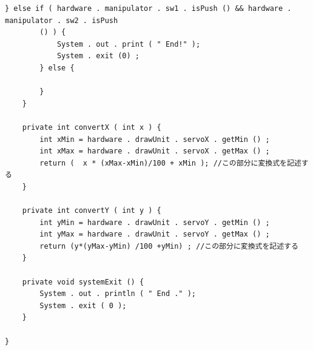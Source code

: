 \documentclass{jarticle}
\begin{document}
\begin{lstlisting}[caption=FigureCheckTool]
        } else if ( hardware . manipulator . sw1 . isPush () && hardware . manipulator . sw2 . isPush
        () ) {
            System . out . print ( " End!" );
            System . exit (0) ;
        } else {

        }
    }

    private int convertX ( int x ) {
        int xMin = hardware . drawUnit . servoX . getMin () ;
        int xMax = hardware . drawUnit . servoX . getMax () ;
        return (  x * (xMax-xMin)/100 + xMin ); //この部分に変換式を記述する
    }

    private int convertY ( int y ) {
        int yMin = hardware . drawUnit . servoY . getMin () ;
        int yMax = hardware . drawUnit . servoY . getMax () ;
        return (y*(yMax-yMin) /100 +yMin) ; //この部分に変換式を記述する
    }

    private void systemExit () {
        System . out . println ( " End ." );
        System . exit ( 0 );
    }

}
\end{lstlisting}
\\
\end{document}
